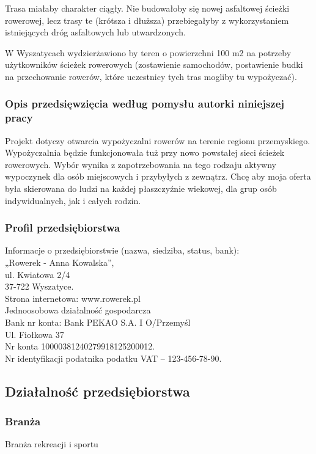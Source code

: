 \documentclass{sprawozdanie-agh}
\begin{document}
		Trasa miałaby charakter ciągły. Nie budowałoby się nowej asfaltowej ścieżki rowerowej, lecz trasy te (krótsza i dłuższa) przebiegałyby z wykorzystaniem istniejących dróg asfaltowych lub utwardzonych.
	
		W Wyszatycach wydzierżawiono by teren o powierzchni 100 m2 na potrzeby użytkowników ścieżek rowerowych (zostawienie samochodów, postawienie budki na przechowanie  rowerów, które uczestnicy tych tras mogliby tu wypożyczać).
	
		\subsubsection{Opis przedsięwzięcia według pomysłu autorki niniejszej pracy}
		
		Projekt dotyczy otwarcia wypożyczalni rowerów na terenie regionu przemyskiego. Wypożyczalnia będzie funkcjonowała tuż przy nowo powstałej sieci ścieżek rowerowych. Wybór wynika z zapotrzebowania na tego rodzaju aktywny wypoczynek dla osób miejscowych i przybyłych z zewnątrz. Chcę aby moja oferta była skierowana do ludzi na każdej płaszczyźnie wiekowej, dla grup osób indywidualnych, jak i całych rodzin.
		
		\subsubsection{Profil przedsiębiorstwa}
		Informacje o przedsiębiorstwie (nazwa, siedziba, status, bank):\\
		„Rowerek - Anna Kowalska”,\\
		ul. Kwiatowa 2/4\\
		37-722 Wyszatyce.\\
		Strona internetowa: www.rowerek.pl\\
		Jednoosobowa działalność gospodarcza\\
		Bank nr konta: Bank PEKAO S.A. I O/Przemyśl\\
		Ul. Fiołkowa 37\\
		Nr konta 10000381240279918125200012.\\
		Nr identyfikacji podatnika podatku VAT – 123-456-78-90.
		
		\subsection{Działalność przedsiębiorstwa}

		\subsubsection{Branża}
		Branża rekreacji i sportu
\end{document}
